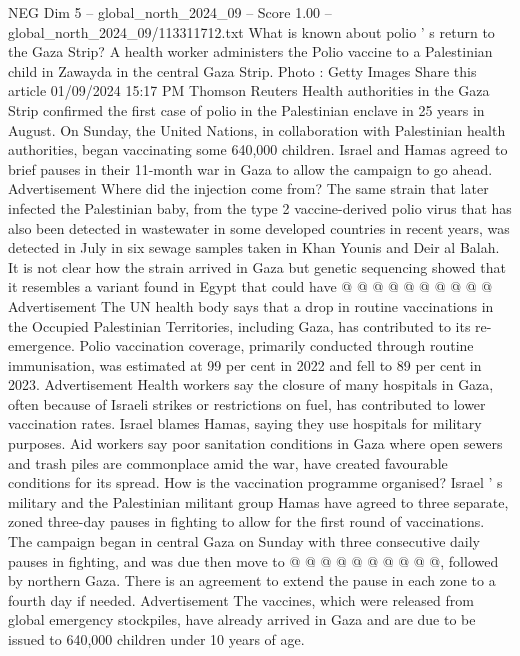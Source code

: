 \begin{textsample}{NEG Dim 5 – global\_north\_2024\_09 – Score 1.00 – global\_north\_2024\_09/113311712.txt}  \label{ex:f5_neg_149}
What is known about polio ' s return to the Gaza Strip?
A health worker administers the Polio vaccine to a Palestinian child in Zawayda in the central Gaza Strip.
Photo : Getty Images Share this article 01/09/2024 15:17 PM Thomson Reuters Health authorities in the Gaza Strip confirmed the first case of polio in the Palestinian enclave in 25 years in August.
On Sunday, the United Nations, in collaboration with Palestinian health authorities, began vaccinating some 640,000 children.
Israel and Hamas agreed to brief pauses in their 11-month war in Gaza to allow the campaign to go ahead.
Advertisement Where did the injection come from?
The same strain that later infected the Palestinian baby, from the type 2 vaccine-derived polio virus that has also been detected in wastewater in some developed countries in recent years, was detected in July in six sewage samples taken in Khan Younis and Deir al Balah.
It is not clear how the strain arrived in Gaza but genetic sequencing showed that it resembles a variant found in Egypt that could have @ @ @ @ @ @ @ @ @ @ Advertisement The UN health body says that a drop in routine vaccinations in the Occupied Palestinian Territories, including Gaza, has contributed to its re-emergence.
Polio vaccination coverage, primarily conducted through routine immunisation, was estimated at 99 per cent in 2022 and fell to 89 per cent in 2023.
Advertisement Health workers say the closure of many hospitals in Gaza, often because of Israeli strikes or restrictions on fuel, has contributed to lower vaccination rates.
Israel blames Hamas, saying they use hospitals for military purposes.
Aid workers say poor sanitation conditions in Gaza where open sewers and trash piles are commonplace amid the war, have created favourable conditions for its spread.
How is the vaccination programme organised?
Israel ' s military and the Palestinian militant group Hamas have agreed to three separate, zoned three-day pauses in fighting to allow for the first round of vaccinations.
The campaign began in central Gaza on Sunday with three consecutive daily pauses in fighting, and was due then move to @ @ @ @ @ @ @ @ @ @, followed by northern Gaza.
There is an agreement to extend the pause in each zone to a fourth day if needed.
Advertisement The vaccines, which were released from global emergency stockpiles, have already arrived in Gaza and are due to be issued to 640,000 children under 10 years of age.

\end{textsample}
